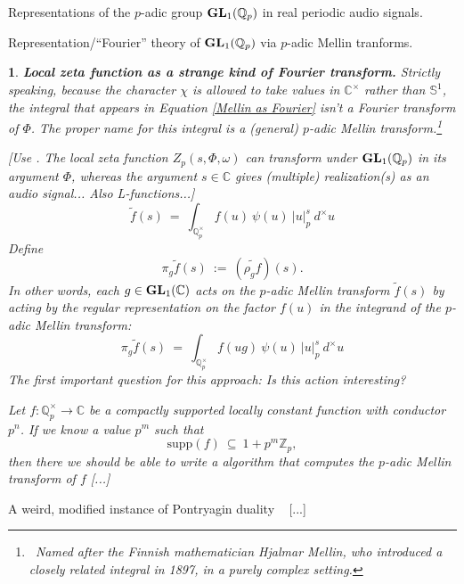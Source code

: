 \documentclass[letterpaper,11pt, reqno]{amsart}
\newtheorem{monodromy theorem}{Monodromy Theorem}[subsection]
\newtheorem{wild conjecture}[theorem]{Wild Conjecture}
\newtheorem{research objectives}{Research objectives}[subsection]
\newtheorem{research question}[theorem]{Research questions}
\newtheorem{aside question}[theorem]{Aside question}
\newtheorem{audio example}[theorem]{\loudspeaker[3] Example}
\newtheorem{blank remark}[theorem]{}
\newtheorem{ssubsection}[theorem]{}
\newtheorem{terminology and comment}[theorem]{Terminology and comment}
\newtheorem{purity hypothesis}[theorem]{Purity hypothesis}
\newtheorem{corollary of the purity hypothesis}[theorem]{Corollary of the purity hypothesis}
\newcommand{\CC} {{\mathbb C}}
\newcommand{\QQ} {{\mathbb Q}}
\newcommand{\ZZ} {{\mathbb Z}}
\newcommand{\lra}{{\longrightarrow}}
\numberwithin{equation}{theorem}
\begin{document}
\begin{section}{Representations of the $p$-adic group $\bold{GL}_{1}(\mathbb{Q}_{p})$
in real periodic audio signals.}
\begin{subsection}{Representation/``Fourier'' theory of $\bold{GL}_{1}(\QQ_p)$ via $p$-adic Mellin tranforms.}
\begin{ssubsection}{{\bf Local zeta function as a strange kind of Fourier transform.}}
\normalfont
Strictly speaking, because the character $\chi$ is allowed to take values in $\CC^{\times}$ rather than $\mathbb{S}^1$, the integral that appears in Equation \eqref{Mellin as Fourier} isn't a Fourier transform of $\Phi$. The proper name for this integral is a ({\em general}) {\em $p$-adic Mellin transform}.\footnote{\ Named after the Finnish mathematician Hjalmar Mellin, who introduced a closely related integral in 1897, in a purely complex setting.}
 
{\color{red} [Use \cite[\S\S2.3-5 \& 2.8]{GHv1}. The local zeta function $Z_p(s,\Phi,\omega)$ can transform under $\bold{GL}_{1}(\QQ_p)$ in its argument $\Phi$, whereas the argument $s\in\CC$ gives (multiple) realization(s) as an audio signal... Also L-functions...]} 
	$$
	\widetilde{f}(s)
	\ =\ 
	\int_{\QQ_{p}^{\times}}\!\!f(u)\ \psi(u)\ |u|^{s}_{p}\ d^{\times}u
	$$
Define
	$$
	\pi_{g}\widetilde{f}(s)
	\ :=\ 
	(\widetilde{{\rho_{g}f}})(s).
	$$
In other words, each $g\in\bold{GL}_{1}(\CC)$ acts on the $p$-adic Mellin transform $\widetilde{f}(s)$ by acting by the regular representation on the factor $f(u)$ in the integrand of the $p$-adic Mellin transform:
	$$
	\pi_{g}\widetilde{f}(s)
	\ =\ 
	\int_{\QQ_{p}^{\times}}\!\!f(ug)\ \psi(u)\ |u|^{s}_{p}\ d^{\times}u
	$$
The first important question for this approach: Is this action interesting?

	Let $f:\QQ_{p}^{\times}\lra\CC$ be a compactly supported locally constant function with conductor $p^n$. If we know a value $p^{m}$ such that
	$$
	\text{supp}(f)\ \subseteq\ 1+p^{m}\ZZ_{p},
	$$
then there we should be able to write a algorithm that computes the $p$-adic Mellin transform of $f$ {\color{red} [...]}

\end{ssubsection}
\end{subsection}

\begin{subsection}{ A weird, modified instance of Pontryagin duality}
\ {\color{red} [...]}


\end{subsection}
\end{section}
\end{document}
